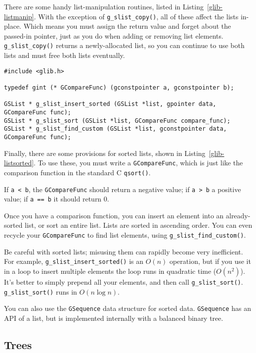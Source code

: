 There are some handy list-manipulation routines, listed in Listing~\ref{glib-listmanip}. With the exception of \lstinline{g_slist_copy()}, all of these affect the lists in-place. Which means you must assign the return value and forget about the passed-in pointer, just as you do when adding or removing list elements. \lstinline{g_slist_copy()} returns a newly-allocated list, so you can continue to use both lists and must free both lists eventually.

\begin{lstlisting}[float, caption={Sorted lists}, label=glib-listsorted]
#include <glib.h>

typedef gint (* GCompareFunc) (gconstpointer a, gconstpointer b);

GSList * g_slist_insert_sorted (GSList *list, gpointer data, GCompareFunc func);
GSList * g_slist_sort (GSList *list, GCompareFunc compare_func);
GSList * g_slist_find_custom (GSList *list, gconstpointer data, GCompareFunc func);
\end{lstlisting}

Finally, there are some provisions for sorted lists, shown in Listing~\ref{glib-listsorted}. To use these, you must write a \lstinline{GCompareFunc}, which is just like the comparison function in the standard C \lstinline{qsort()}.

If \lstinline{a < b}, the \lstinline{GCompareFunc} should return a negative value; if \lstinline{a > b} a positive value; if \lstinline{a == b} it should return 0.

Once you have a comparison function, you can insert an element into an already-sorted list, or sort an entire list. Lists are sorted in ascending order. You can even recycle your \lstinline{GCompareFunc} to find list elements, using \lstinline{g_slist_find_custom()}.

Be careful with sorted lists; misusing them can rapidly become very inefficient. For example, \lstinline{g_slist_insert_sorted()} is an $O(n)$ operation, but if you use it in a loop to insert multiple elements the loop runs in quadratic time ($O(n^2)$). It's better to simply prepend all your elements, and then call \lstinline{g_slist_sort()}. \lstinline{g_slist_sort()} runs in $O(n \log n)$.

You can also use the \lstinline{GSequence} data structure for sorted data. \lstinline{GSequence} has an API of a list, but is implemented internally with a balanced binary tree.

\subsection{Trees}

